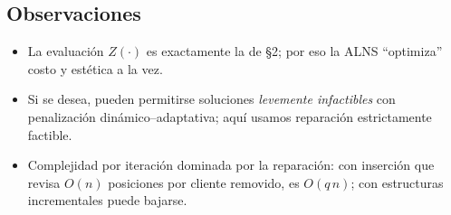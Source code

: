 \documentclass[11pt, a4paper]{article}
\begin{document}
\subsection{Observaciones}
\begin{itemize}[leftmargin=1.4em]
\item La evaluación $Z(\cdot)$ es exactamente la de \S2; por eso la ALNS “optimiza” costo y estética a la vez.
\item Si se desea, pueden permitirse soluciones \emph{levemente infactibles} con penalización dinámico–adaptativa; aquí usamos reparación estrictamente factible.
\item Complejidad por iteración dominada por la reparación: con inserción que revisa $O(n)$ posiciones por cliente removido, es $O(q\,n)$; con estructuras incrementales puede bajarse.
\end{itemize}
\end{document}
